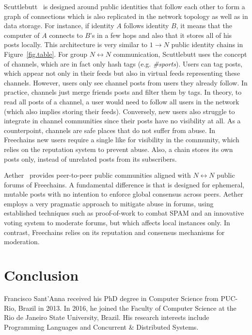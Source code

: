 \documentclass[10pt,journal,compsoc]{IEEEtran}
\newcommand{\FC}       {Freechains\xspace}
\newcommand{\Xon} {$1{\rightarrow}N$\xspace}
\newcommand{\Xnn} {$N{\leftrightarrow}N$\xspace}
\begin{document}
Scuttlebutt~\cite{p2p.scuttlebutt} is designed around public identities that
follow each other to form a graph of connections which is also replicated in
the network topology as well as in data storage.
For instance, if identity $A$ follows identity $B$, it means that the computer
of $A$ connects to $B$'s in a few hops and also that it stores all of his posts
locally.
This architecture is very similar to \Xon public identity chains in
Figure~\ref{fig.table}.
%
For group \Xnn communication, Scuttlebutt uses the concept of channels, which
are in fact only hash tags (e.g. \emph{\#sports}).
Users can tag posts, which appear not only in their feeds but also in virtual
feeds representing these channels.
However, users only see channel posts from users they already follow.
In practice, channels just merge friends posts and filter them by tags.
In theory, to read all posts of a channel, a user would need to follow all
users in the network (which also implies storing their feeds).
Conversely, new users also struggle to integrate in channel communities since
their posts have no visibility at all.
As a counterpoint, channels are safe places that do not suffer from abuse.
%
In \FC new users require a single like for visibility in the community, which
relies on the reputation system to prevent abuse.
Also, a chain stores its own posts only, instead of unrelated posts from its
subscribers.

Aether~\cite{p2p.ecosystem} provides peer-to-peer public communities aligned
with \Xnn public forums of \FC.
A fundamental difference is that is designed for ephemeral, mutable posts with
no intention to enforce global consensus across peers.
Aether employs a very pragmatic approach to mitigate abuse in forums, using
established techniques such as proof-of-work to combat SPAM and an innovative
voting system to moderate forums, but which affects local instances only.
In contrast, \FC relies on its reputation and consensus mechanisms for
moderation.

\section{Conclusion}
\label{sec.conclusion}




\begin{IEEEbiography}{Francisco Sant'Anna}
received his PhD degree in Computer Science from PUC-Rio, Brazil in
2013.
In 2016, he joined the Faculty of Computer Science at the Rio de Janeiro State
University, Brazil.
His research interests include Programming Languages and Concurrent \&
Distributed Systems.
\end{IEEEbiography}
\end{document}
